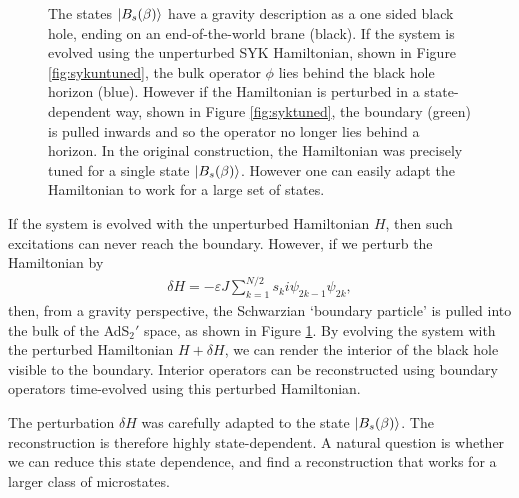 \documentclass[12pt]{article}
\begin{document}
\begin{figure} [t]
\begin{subfigure}{.48\textwidth}
\end{subfigure}
\caption{The states $\ket{B_s(\beta)}$ have a gravity description as a one sided black hole, ending on an end-of-the-world brane (black). If the system is evolved using the unperturbed SYK Hamiltonian, shown in Figure \ref{fig:sykuntuned}, the bulk operator $\phi$ lies behind the black hole horizon (blue). However if the Hamiltonian is perturbed in a state-dependent way, shown in Figure \ref{fig:syktuned}, the boundary (green) is pulled inwards and so the operator no longer lies behind a horizon. In the original construction, the Hamiltonian was precisely tuned for a single state  $\ket{B_s(\beta)}$. However one can easily adapt the Hamiltonian to work for a large set of states.}
\label{fig:SYK}
\end{figure}


If the system is evolved with the unperturbed Hamiltonian $H$, then such excitations can never reach the boundary. However, if we perturb the Hamiltonian by
\begin{align} \label{eq:origpert}
\delta H = - \varepsilon J \sum_{k=1}^{N/2} s_k i \psi_{2k -1} \psi_{2k},
\end{align}
then, from a gravity perspective, the Schwarzian `boundary particle' is pulled into the bulk of the AdS$_2'$ space, as shown in Figure \ref{fig:SYK}. By evolving the system with the perturbed Hamiltonian $H + \delta H$, we can render the interior of the black hole visible to the boundary. Interior operators can be reconstructed using boundary operators time-evolved using this perturbed Hamiltonian.

The perturbation $\delta H$ was carefully adapted to the state $\ket{B_s (\beta)}$. The reconstruction is therefore highly state-dependent. A natural question is whether we can reduce this state dependence, and find a reconstruction that works for a larger class of microstates.
\end{document}
